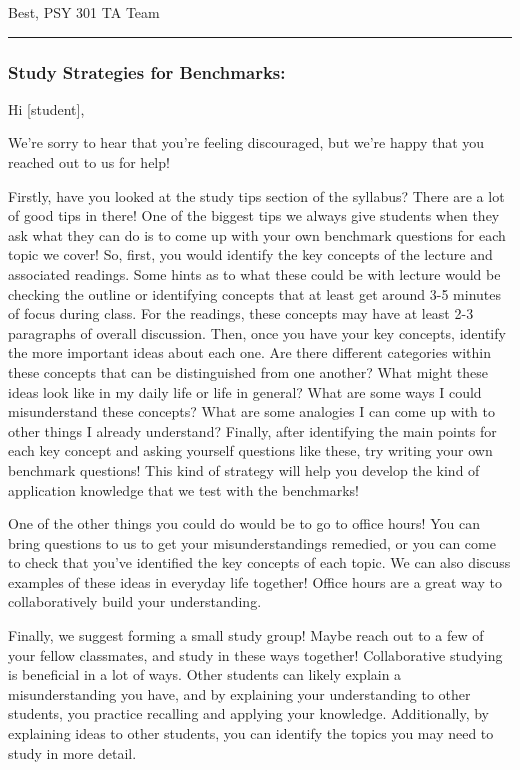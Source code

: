 \documentclass[
]{article}
\begin{document}
Best,
PSY 301 TA Team

\begin{center}\rule{0.5\linewidth}{0.5pt}\end{center}

\hypertarget{study-strategies-for-benchmarks}{%
\subsubsection{Study Strategies for Benchmarks:}\label{study-strategies-for-benchmarks}}

Hi {[}student{]},

We're sorry to hear that you're feeling discouraged, but we're happy that you reached out to us for help!

Firstly, have you looked at the study tips section of the syllabus? There are a lot of good tips in there!
One of the biggest tips we always give students when they ask what they can do is to come up with your own benchmark questions for each topic we cover! So, first, you would identify the key concepts of the lecture and associated readings. Some hints as to what these could be with lecture would be checking the outline or identifying concepts that at least get around 3-5 minutes of focus during class. For the readings, these concepts may have at least 2-3 paragraphs of overall discussion. Then, once you have your key concepts, identify the more important ideas about each one. Are there different categories within these concepts that can be distinguished from one another? What might these ideas look like in my daily life or life in general? What are some ways I could misunderstand these concepts? What are some analogies I can come up with to other things I already understand? Finally, after identifying the main points for each key concept and asking yourself questions like these, try writing your own benchmark questions! This kind of strategy will help you develop the kind of application knowledge that we test with the benchmarks!

One of the other things you could do would be to go to office hours! You can bring questions to us to get your misunderstandings remedied, or you can come to check that you've identified the key concepts of each topic. We can also discuss examples of these ideas in everyday life together! Office hours are a great way to collaboratively build your understanding.

Finally, we suggest forming a small study group! Maybe reach out to a few of your fellow classmates, and study in these ways together! Collaborative studying is beneficial in a lot of ways. Other students can likely explain a misunderstanding you have, and by explaining your understanding to other students, you practice recalling and applying your knowledge. Additionally, by explaining ideas to other students, you can identify the topics you may need to study in more detail.
\end{document}
